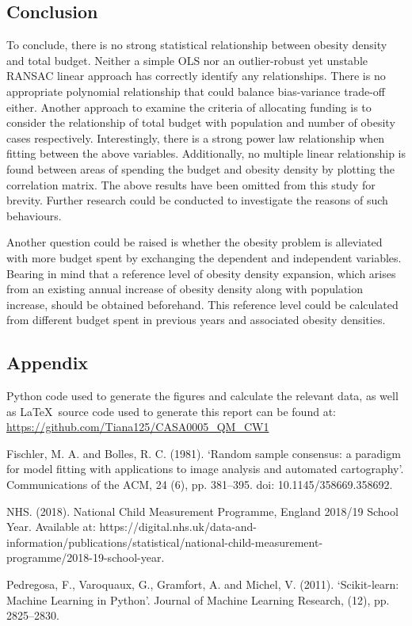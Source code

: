\documentclass[12pt]{article}
\begin{document}
\subsection{Conclusion}

To conclude, there is no strong statistical relationship between obesity density and total budget. Neither a simple OLS nor an outlier-robust yet unstable RANSAC linear approach has correctly identify any relationships. There is no appropriate polynomial relationship that could balance bias-variance trade-off either. Another approach to examine the criteria of allocating funding is to consider the relationship of total budget with population and number of obesity cases respectively. Interestingly, there is a strong power law relationship when fitting between the above variables. Additionally, no multiple linear relationship is found between areas of spending the budget and obesity density by plotting the correlation matrix. The above results have been omitted from this study for brevity. Further research could be conducted to investigate the reasons of such behaviours. 

Another question could be raised is whether the obesity problem is alleviated with more budget spent by exchanging the dependent and independent variables. Bearing in mind that a reference level of obesity density expansion, which arises from an existing annual increase of obesity density along with population increase, should be obtained beforehand. This reference level could be calculated from different budget spent in previous years and associated obesity densities. 

\subsection{Appendix}
Python code used to generate the figures and calculate the relevant data, as well as \LaTeX\  source code used to generate this report can be found at: \url{https://github.com/Tiana125/CASA0005_QM_CW1}


\newpage

\appendix



Fischler, M. A. and Bolles, R. C. (1981). ‘Random sample consensus: a paradigm for model fitting with applications to image analysis and automated cartography’. Communications of the ACM, 24 (6), pp. 381–395. doi: 10.1145/358669.358692.


NHS. (2018). National Child Measurement Programme, England 2018/19 School Year. Available at: https://digital.nhs.uk/data-and-information/publications/statistical/national-child-measurement-programme/2018-19-school-year.


Pedregosa, F., Varoquaux, G., Gramfort, A. and Michel, V. (2011). ‘Scikit-learn: Machine Learning in Python’. Journal of Machine Learning Research, (12), pp. 2825–2830.
\end{document}
